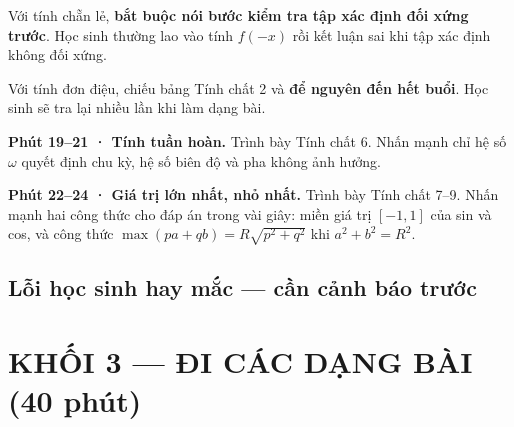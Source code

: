 \documentclass[11pt, a4paper]{article}
\begin{document}
Với tính chẵn lẻ, \textbf{bắt buộc nói bước kiểm tra tập xác định đối xứng trước}. Học sinh thường lao vào tính $f(-x)$ rồi kết luận sai khi tập xác định không đối xứng.

Với tính đơn điệu, chiếu bảng Tính chất 2 và \textbf{để nguyên đến hết buổi}. Học sinh sẽ tra lại nhiều lần khi làm dạng bài.

\textbf{Phút 19–21 · Tính tuần hoàn.} Trình bày Tính chất 6. Nhấn mạnh chỉ hệ số $\omega$ quyết định chu kỳ, hệ số biên độ và pha không ảnh hưởng.

\textbf{Phút 22–24 · Giá trị lớn nhất, nhỏ nhất.} Trình bày Tính chất 7–9. Nhấn mạnh hai công thức cho đáp án trong vài giây: miền giá trị $[-1,1]$ của sin và cos, và công thức $\max(pa+qb) = R\sqrt{p^2+q^2}$ khi $a^2+b^2 = R^2$.

\subsection{Lỗi học sinh hay mắc — cần cảnh báo trước}


\section{KHỐI 3 — ĐI CÁC DẠNG BÀI (40 phút)}
\end{document}
